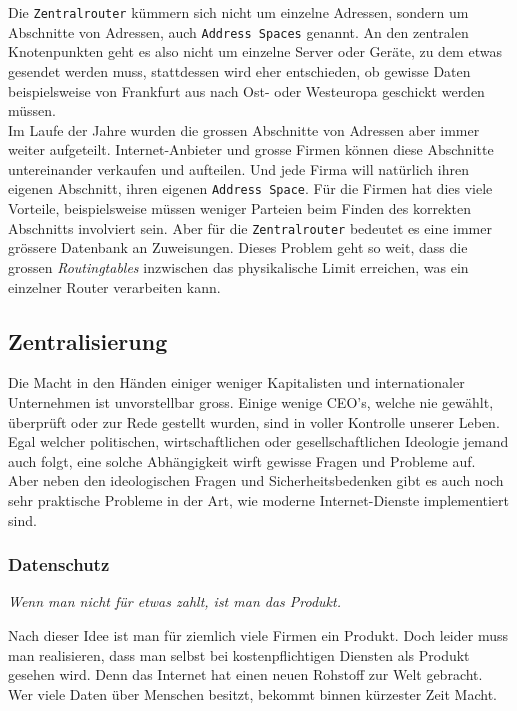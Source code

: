 \documentclass[11pt]{article}
\begin{document}
\noindent Die \texttt{Zentralrouter} kümmern sich nicht um einzelne Adressen,
sondern um Abschnitte von Adressen, auch \texttt{Address Spaces} genannt. An
den zentralen Knotenpunkten geht es also nicht um einzelne Server oder
Geräte, zu dem etwas gesendet werden muss, stattdessen wird eher
entschieden, ob gewisse Daten beispielsweise von Frankfurt aus nach
Ost- oder Westeuropa geschickt werden müssen.\\

\noindent Im Laufe der Jahre wurden die grossen Abschnitte von
Adressen aber immer weiter aufgeteilt. Internet-Anbieter und grosse
Firmen können diese Abschnitte untereinander verkaufen und aufteilen.
Und jede Firma will natürlich ihren eigenen Abschnitt, ihren eigenen
\texttt{Address Space}. Für die Firmen hat dies viele Vorteile, beispielsweise
müssen weniger Parteien beim Finden des korrekten Abschnitts
involviert sein. Aber für die \texttt{Zentralrouter} bedeutet es eine immer
grössere Datenbank an Zuweisungen. Dieses Problem geht so weit, dass
die grossen \emph{Routingtables} inzwischen das physikalische Limit
erreichen, was ein einzelner Router verarbeiten kann.
\subsection{Zentralisierung}
\label{sec:orge7d2f03}
\noindent Die Macht in den Händen einiger weniger Kapitalisten und
internationaler Unternehmen ist unvorstellbar gross. Einige wenige
CEO's, welche nie gewählt, überprüft oder zur Rede gestellt wurden,
sind in voller Kontrolle unserer Leben. Egal welcher politischen,
wirtschaftlichen oder gesellschaftlichen Ideologie jemand auch folgt,
eine solche Abhängigkeit wirft gewisse Fragen und Probleme auf.\\

\noindent Aber neben den ideologischen Fragen und Sicherheitsbedenken
gibt es auch noch sehr praktische Probleme in der Art, wie moderne
Internet-Dienste implementiert sind.
\subsubsection{Datenschutz}
\label{sec:orga0655ee}
\begin{center}
\emph{Wenn man nicht für etwas zahlt, ist man das Produkt.}
\end{center}
Nach dieser Idee ist man für ziemlich viele Firmen ein Produkt. Doch
leider muss man realisieren, dass man selbst bei kostenpflichtigen
Diensten als Produkt gesehen wird. Denn das Internet hat einen neuen
Rohstoff zur Welt gebracht. Wer viele Daten über Menschen besitzt,
bekommt binnen kürzester Zeit Macht.\\
\end{document}
